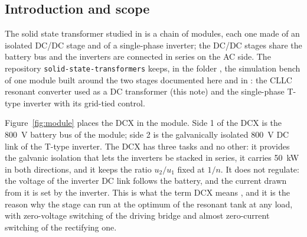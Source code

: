 \documentclass[12pt,a4paper]{scrartcl}
\newcommand{\ped}[1]{_{\mathrm{#1}}}
\newcommand{\code}[1]{\texttt{#1}}
\begin{document}
\begin{onehalfspace}
\section{Introduction and scope}
\label{sec:intro}

The solid state transformer studied in \cite{sst_doc} is a chain of modules, each one made of an isolated DC/DC stage and of a single-phase inverter; the DC/DC stages share the battery bus and the inverters are connected in series on the AC side. The repository \code{solid-state-transformers} \cite{sst_repo} keeps, in the folder , the simulation bench of one module built around the two stages documented here and in \cite{spinv_doc}: the CLLC resonant converter used as a DC transformer (this note) and the single-phase T-type inverter with its grid-tied control.

Figure~\ref{fig:module} places the DCX in the module. Side 1 of the DCX is the \SI{800}{\volt} battery bus of the module; side 2 is the galvanically isolated \SI{800}{\volt} DC link of the T-type inverter. The DCX has three tasks and no other: it provides the galvanic isolation that lets the inverters be stacked in series, it carries \SI{50}{\kilo\watt} in both directions, and it keeps the ratio $u\ped{2}/u\ped{1}$ fixed at $1/n$. It does not regulate: the voltage of the inverter DC link follows the battery, and the current drawn from it is set by the inverter. This is what the term DCX means \cite{jung2013, huang2010}, and it is the reason why the stage can run at the optimum of the resonant tank at any load, with zero-voltage switching of the driving bridge and almost zero-current switching of the rectifying one.


\end{onehalfspace}
\end{document}
